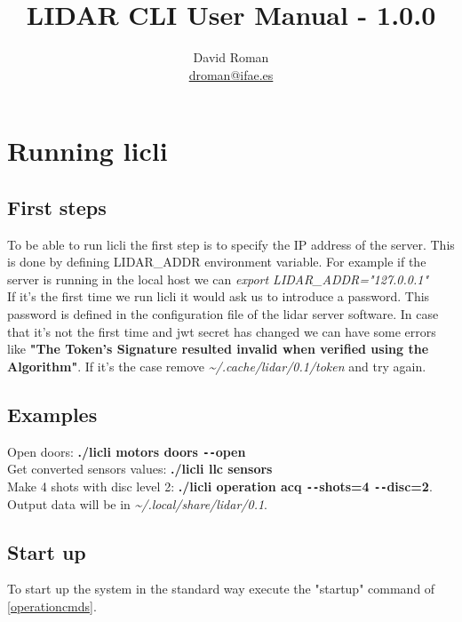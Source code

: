 \documentclass[letterpaper, 10 pt]{article}
\begin{document}
\title{LIDAR CLI User Manual - 1.0.0}
\author{David Roman \\  \href{mailto:droman@ifae.es}{droman@ifae.es} }
\maketitle
\pagestyle{empty}
\newpage
\tableofcontents
\newpage
{}
\pagestyle{plain}

\section{Running licli}
\subsection{First steps}
To be able to run licli the first step is to specify the IP address of the server. This is done by defining LIDAR\_ADDR environment variable. For example if the server is running in the local host we can \emph{export LIDAR\_ADDR="127.0.0.1"}\\
\linebreak
If it's the first time we run licli it would ask us to introduce a password. This password is defined in the configuration file of the lidar server software. 
In case that it's not the first time and jwt secret has changed we can have some errors like \textbf{"The Token's Signature resulted invalid when verified using the Algorithm"}. If it's the case remove \textit{\~{}/.cache/lidar/0.1/token} and try again.\\

\subsection{Examples}

Open doors: \textbf{./licli motors doors \texttt{-{}-}open}\\
Get converted sensors values: \textbf{./licli llc sensors}\\
Make 4 shots with disc level 2: \textbf{./licli operation acq \texttt{-{}-}shots=4 \texttt{-{}-}disc=2}. Output data will be in \textit{\~{}/.local/share/lidar/0.1}.

\subsection{Start up}
To start up the system in the standard way execute the "startup" command of \ref{operationcmds}.\\
\end{document}
